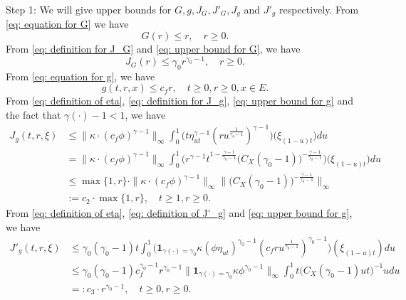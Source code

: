 \documentclass[12pt, a4paper]{amsart}
\theoremstyle{definition}
\numberwithin{equation}{section}
\begin{document}
	Step 1: 
	We will give upper bounds for $G,g, J_G, J'_G, J_g$ and $J'_g$ respectively.
	From \eqref{eq: equation for G} we have
\[\label{eq: upper bound for G}
	G(r)
	\leq r,
	\quad r \geq 0.
\]	
	From \eqref{eq: definition for J_G} and \eqref{eq: upper bound for G}, we have
\[\label{eq: upper bound for J_G}
	J_G(r)
	\leq \gamma_0 r^{\gamma_0 - 1},
	\quad r \geq 0.
\]
	From \eqref{eq: equation for g}, we have
\[\label{eq: upper bound for g}
	g(t,r, x) \leq c_f r,
	\quad t\geq 0, r \geq 0, x\in E.
\]
	From \eqref{eq: definition of eta}, \eqref{eq: definition for J_g}, \eqref{eq: upper bound for g} and the fact that $\gamma(\cdot) - 1 < 1$, we have
\[\begin{split}
	J_g(t,r, \xi)
	&\leq \|\kappa \cdot (c_f\phi)^{\gamma - 1} \|_\infty \int_0^1 \big(  t\eta_{ut}^{\gamma - 1} (ru^{\frac{1}{\gamma_0 - 1}} )^{\gamma-1}  \big) \big(  \xi_{(1-u)t} \big) du
	\\&= \| \kappa \cdot (c_f\phi)^{\gamma - 1} \|_\infty \int_0^1 \big(  r^{\gamma - 1}t^{1-\frac{\gamma - 1}{\gamma_0 - 1}}  \big( C_X (\gamma_0 - 1) \big)^{-\frac{\gamma - 1}{\gamma_0 - 1}}  \big) \big( \xi_{(1-u)t} \big) du
	\\& \leq \max\{1,r\} \cdot \| \kappa \cdot (c_f\phi)^{\gamma - 1} \|_\infty \Big\|  \big( C_X (\gamma_0 - 1) \big)^{-\frac{\gamma - 1}{\gamma_0 - 1}}\Big\|_\infty
	\\& := c_2 \cdot \max  \{1,r\},
	\quad t\geq 1, r\geq 0.
\end{split}\]
	From \eqref{eq: definition of eta}, \eqref{eq: definition of J'_g} and \eqref{eq: upper bound for g}, we have
\[\begin{split}
	J'_g(t,r,\xi)
	&\leq \gamma_0 (\gamma_0 - 1) t \int_0^1 \big( \mathbf 1_{\gamma(\cdot) = \gamma_0} \kappa (\phi \eta_{ut})^{\gamma_0 - 1} (c_f ru^{\frac{1}{\gamma_0 - 1}})^{\gamma_0 - 1}\big) (\xi_{(1-u)t}) du
	\\&\leq \gamma_0(\gamma_0 - 1) c_f^{\gamma_0 - 1}r^{\gamma_0 - 1} \|  \mathbf 1_{\gamma(\cdot) = \gamma_0}  \kappa \phi^{\gamma_0 - 1} \|_\infty \int_0^1 t \big( C_X(\gamma_0 - 1) ut \big)^{- 1}  u  du
	\\&=: c_3 \cdot r^{\gamma_0 - 1},
	\quad t\geq 0, r\geq 0.
\end{split}\]
\end{document}
